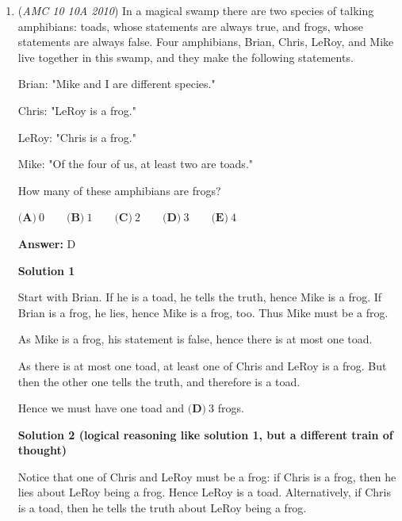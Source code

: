 \begin{enumerate}
 



\textbf{Solution 4}

Notice that $\triangle ADF \sim \triangle CDA$ (by AA Similarity.) Since the corresponding angles of a pair of similar triangles are congruent, we have $\angle DAC = \angle DFA = 60^\circ.$ Since $AB = 2 \cdot AC$ and $\angle DFA = 60^\circ,$ we have that $\triangle ABC$ is congruent by SAS to a $30-60-90$ right triangle, which gives the answer $\boxed{\textbf{(C)}}$.~clever14710owl

 


	\item (\textit{AMC 10 10A 2010}) In a magical swamp there are two species of talking amphibians: toads, whose statements are always true, and frogs, whose statements are always false. Four amphibians, Brian, Chris, LeRoy, and Mike live together in this swamp, and they make the following statements.


 Brian: "Mike and I are different species."


 Chris: "LeRoy is a frog."


 LeRoy: "Chris is a frog."


 Mike: "Of the four of us, at least two are toads."


 How many of these amphibians are frogs?


 $\textbf{(A)}\ 0 \qquad \textbf{(B)}\ 1 \qquad \textbf{(C)}\ 2 \qquad \textbf{(D)}\ 3 \qquad \textbf{(E)}\ 4$

 \textbf{Answer: }D



\textbf{Solution 1}

Start with Brian. If he is a toad, he tells the truth, hence Mike is a frog. If Brian is a frog, he lies, hence Mike is a frog, too. Thus Mike must be a frog.

 As Mike is a frog, his statement is false, hence there is at most one toad.

 As there is at most one toad, at least one of Chris and LeRoy is a frog. But then the other one tells the truth, and therefore is a toad.

 Hence we must have one toad and $\boxed{\textbf{(D)}\ 3}$ frogs.

 



\textbf{Solution 2 (logical reasoning like solution 1, but a different train of thought)}

Notice that one of Chris and LeRoy must be a frog: if Chris is a frog, then he lies about LeRoy being a frog. Hence LeRoy is a toad. Alternatively, if Chris is a toad, then he tells the truth about LeRoy being a frog.


\end{enumerate}
